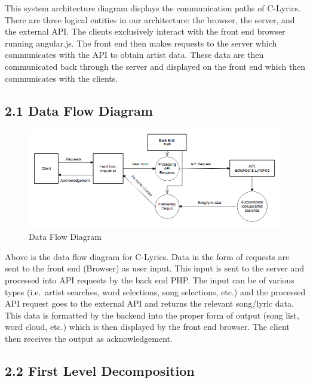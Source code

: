 \documentclass[]{article}
\begin{document}
This system architecture diagram displays the communication paths of
C-Lyrics. There are three logical entities in our architecture: the
browser, the server, and the external API. The clients exclusively
interact with the front end browser running angular.js. The front end
then makes requests to the server which communicates with the API to
obtain artist data. These data are then communicated back through the
server and displayed on the front end which then communicates with the
clients.

\subsection{2.1 Data Flow Diagram}\label{data-flow-diagram}

\begin{figure}[htbp]
\centering
\includegraphics{data_flow.png}
\caption{Data Flow Diagram}
\end{figure}

Above is the data flow diagram for C-Lyrics. Data in the form of
requests are sent to the front end (Browser) as user input. This input
is sent to the server and processed into API requests by the back end
PHP. The input can be of various types (i.e.~artist searches, word
selections, song selections, etc.) and the processed API request goes to
the external API and returns the relevant song/lyric data. This data is
formatted by the backend into the proper form of output (song list, word
cloud, etc.) which is then displayed by the front end browser. The
client then receives the output as acknowledgement.

\subsection{2.2 First Level Decomposition}\label{first-level-decomposition}
\end{document}
